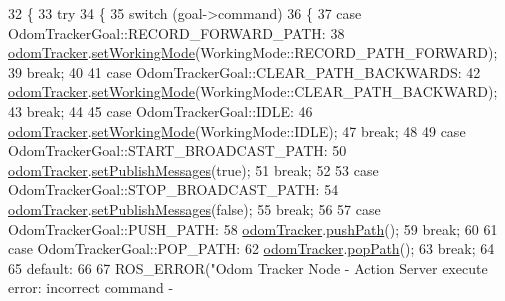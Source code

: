 \begin{DoxyCode}
32   \{
33     \textcolor{keywordflow}{try}
34     \{
35       \textcolor{keywordflow}{switch} (goal->command)
36       \{
37       \textcolor{keywordflow}{case} OdomTrackerGoal::RECORD\_FORWARD\_PATH:
38         \hyperlink{classOdomTrackerActionServer_a3e5c4328d3206fbd2fd2708f0aefe651}{odomTracker}.\hyperlink{classodom__tracker_1_1OdomTracker_ac001a40d1107ef0d88aa7db03cafb08c}{setWorkingMode}(WorkingMode::RECORD\_PATH\_FORWARD);
39         \textcolor{keywordflow}{break};
40 
41       \textcolor{keywordflow}{case} OdomTrackerGoal::CLEAR\_PATH\_BACKWARDS:
42         \hyperlink{classOdomTrackerActionServer_a3e5c4328d3206fbd2fd2708f0aefe651}{odomTracker}.\hyperlink{classodom__tracker_1_1OdomTracker_ac001a40d1107ef0d88aa7db03cafb08c}{setWorkingMode}(WorkingMode::CLEAR\_PATH\_BACKWARD);
43         \textcolor{keywordflow}{break};
44 
45       \textcolor{keywordflow}{case} OdomTrackerGoal::IDLE:
46         \hyperlink{classOdomTrackerActionServer_a3e5c4328d3206fbd2fd2708f0aefe651}{odomTracker}.\hyperlink{classodom__tracker_1_1OdomTracker_ac001a40d1107ef0d88aa7db03cafb08c}{setWorkingMode}(WorkingMode::IDLE);
47         \textcolor{keywordflow}{break};
48 
49       \textcolor{keywordflow}{case} OdomTrackerGoal::START\_BROADCAST\_PATH:
50         \hyperlink{classOdomTrackerActionServer_a3e5c4328d3206fbd2fd2708f0aefe651}{odomTracker}.\hyperlink{classodom__tracker_1_1OdomTracker_abcfb8d68a75223ff1daba4930f4f7034}{setPublishMessages}(\textcolor{keyword}{true});
51         \textcolor{keywordflow}{break};
52 
53       \textcolor{keywordflow}{case} OdomTrackerGoal::STOP\_BROADCAST\_PATH:
54         \hyperlink{classOdomTrackerActionServer_a3e5c4328d3206fbd2fd2708f0aefe651}{odomTracker}.\hyperlink{classodom__tracker_1_1OdomTracker_abcfb8d68a75223ff1daba4930f4f7034}{setPublishMessages}(\textcolor{keyword}{false});
55         \textcolor{keywordflow}{break};
56 
57       \textcolor{keywordflow}{case} OdomTrackerGoal::PUSH\_PATH:
58         \hyperlink{classOdomTrackerActionServer_a3e5c4328d3206fbd2fd2708f0aefe651}{odomTracker}.\hyperlink{classodom__tracker_1_1OdomTracker_ad25596446295049cf67a6564aad0dfa0}{pushPath}();
59         \textcolor{keywordflow}{break};
60 
61       \textcolor{keywordflow}{case} OdomTrackerGoal::POP\_PATH:
62         \hyperlink{classOdomTrackerActionServer_a3e5c4328d3206fbd2fd2708f0aefe651}{odomTracker}.\hyperlink{classodom__tracker_1_1OdomTracker_aaba0160e172d1bb7989605852f19c658}{popPath}();
63         \textcolor{keywordflow}{break};
64 
65       \textcolor{keywordflow}{default}:
66 
67         ROS\_ERROR(\textcolor{stringliteral}{"Odom Tracker Node - Action Server execute error: incorrect command - %
}
\end{DoxyCode}
